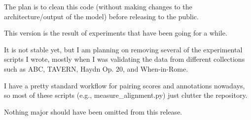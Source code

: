 The plan is to clean this code (without making changes to the architecture/output of the model) before releasing to the public.

This version is the result of experiments that have been going for a while.

It is not stable yet, but I am planning on removing several of the experimental scripts I wrote, mostly when I was validating the data from different collections such as ABC, TAVERN, Haydn Op. 20, and When-in-Rome.

I have a pretty standard workflow for pairing scores and annotations nowadays, so most of these scripts (e.g., measure_alignment.py) just clutter the repository.

Nothing major should have been omitted from this release.

